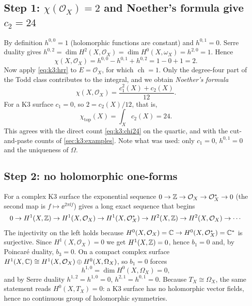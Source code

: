 \subsection{Step 1: \texorpdfstring{$\chi(\mathcal{O}_X)=2$ and Noether's formula give
$c_2=24$}{chi(O)=2 and Noether's formula give c2=24}}

By definition $h^{0,0}=1$ (holomorphic functions are constant) and $h^{0,1}=0$. Serre duality
gives $h^{0,2}=\dim H^2(X,\mathcal{O}_X)=\dim H^0(X,\omega_X)=h^{2,0}=1$. Hence
\begin{equation}\label{eq:k3:chiO}
  \chi(X,\mathcal{O}_X)=h^{0,0}-h^{0,1}+h^{0,2}=1-0+1=2 .
\end{equation}
 Now apply \eqref{eq:k3:hrr} to $E=\mathcal{O}_X$, for
which $\operatorname{ch}=1$. Only the degree-four part of the Todd class contributes to the
integral, and we obtain \emph{Noether's formula}
\begin{equation}\label{eq:k3:noether}
  \chi(X,\mathcal{O}_X)=\frac{c_1^2(X)+c_2(X)}{12}.
\end{equation}
For a K3 surface $c_1=0$, so $2=c_2(X)/12$, that is,
\begin{equation}\label{eq:k3:c2}
  \chi_{\mathrm{top}}(X)=\int_Xc_2(X)=24 .
\end{equation}
 This agrees with the direct count \eqref{eq:k3:chi24} on
the quartic, and with the cut-and-paste counts of \cref{sec:k3:examples}. Note what was used:
only $c_1=0$, $h^{0,1}=0$ and the uniqueness of $\Omega$.

\subsection{Step 2: no holomorphic one-forms}

For a complex K3 surface the exponential sequence $0\to\mathbb{Z}\to\mathcal{O}_X\to\mathcal{O}_X^*\to0$
(the second map is $f\mapsto\ee^{2\pi\ii f}$) gives a long exact sequence that begins
\begin{equation}\label{eq:k3:expseq}
  0\to H^1(X,\mathbb{Z})\to H^1(X,\mathcal{O}_X)\to H^1(X,\mathcal{O}_X^*)\to H^2(X,\mathbb{Z})
  \to H^2(X,\mathcal{O}_X)\to\cdots
\end{equation}
The injectivity on the left holds because $H^0(X,\mathcal{O}_X)=\mathbb{C}\to H^0(X,\mathcal{O}^*_X)
=\mathbb{C}^*$ is surjective. Since $H^1(X,\mathcal{O}_X)=0$ we get $H^1(X,\mathbb{Z})=0$, hence $b_1=0$ and, by
Poincaré duality, $b_3=0$. On a compact complex surface $H^1(X,\mathbb{C})\cong H^1(X,\mathcal{O}_X)
\oplus H^0(X,\Omega_X)$, so $b_1=0$ forces
\begin{equation}
  h^{1,0}=\dim H^0(X,\Omega_X)=0 ,
\end{equation}
and by Serre duality $h^{1,2}=h^{1,0}=0$, $h^{2,1}=h^{0,1}=0$.  Because $T_X\cong\Omega_X$, the same statement reads
$H^0(X,T_X)=0$: a K3 surface has no holomorphic vector fields, hence no continuous group of
holomorphic symmetries.

